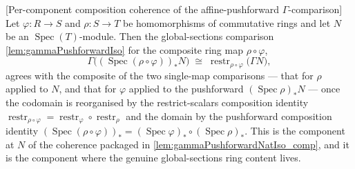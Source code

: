 \begin{lemma}


[Per-component composition coherence of the affine-pushforward \(\Gamma\)-comparison]
  \label{lem:gammaPushforwardIso_comp}
  Let \(\varphi : R \to S\) and \(\rho : S \to T\) be homomorphisms of commutative
  rings and let \(N\) be an \(\operatorname{Spec}(T)\)-module. Then the global-sections
  comparison \cref{lem:gammaPushforwardIso} for the composite ring map
  \(\rho\circ\varphi\),
  \[
    \Gamma\bigl((\operatorname{Spec}(\rho\circ\varphi))_* N\bigr)
      \;\cong\;
    \operatorname{restr}_{\rho\circ\varphi}\bigl(\Gamma N\bigr),
  \]
  agrees with the composite of the two single-map comparisons — that for \(\rho\)
  applied to \(N\), and that for \(\varphi\) applied to the pushforward
  \((\operatorname{Spec}\rho)_* N\) — once the codomain is reorganised by the
  restrict-scalars composition identity
  \(\operatorname{restr}_{\rho\circ\varphi} = \operatorname{restr}_\varphi \circ
  \operatorname{restr}_\rho\) and the domain by the pushforward composition identity
  \((\operatorname{Spec}(\rho\circ\varphi))_* = (\operatorname{Spec}\varphi)_* \circ
  (\operatorname{Spec}\rho)_*\). This is the component at \(N\) of the coherence
  packaged in \cref{lem:gammaPushforwardNatIso_comp}, and it is the component where the
  genuine global-sections ring content lives.
\end{lemma}

